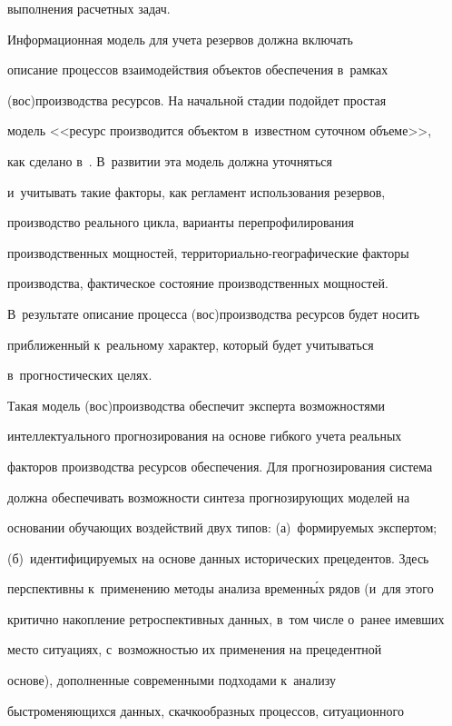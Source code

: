 выполнения расчетных задач.

     

     Информационная модель для учета резервов должна включать 

описание процессов взаимодействия объектов обеспечения в~рамках 

(вос)про\-из\-вод\-ст\-ва ресурсов. На начальной стадии подойдет простая 

модель <<ресурс производится объектом в~известном суточном объеме>>, 

как сделано в~\cite{15-zh}. В~развитии эта модель должна уточняться 

и~учитывать такие факторы, как регламент использования резервов, 

производство реального цикла, варианты перепрофилирования 

производственных мощностей, территориально-географические факторы 

производства, фактическое состояние производственных мощностей. 

В~результате описание процесса (вос)производства ресурсов будет носить 

приближенный к~реальному характер, который будет учитываться 

в~прогностических целях.

     

     Такая модель (вос)производства обеспечит эксперта возможностями 

интеллектуального прогнозирования на основе гибкого учета реальных 

факторов производства ресурсов обеспечения. Для прогнозирования система 

должна обеспечивать возможности синтеза прогнозирующих моделей на 

основании обучающих воздействий двух типов: (а)~формируемых экспертом; 

(б)~идентифицируемых на основе данных исторических прецедентов. Здесь 

перспективны к~применению методы анализа временн\'{ы}х рядов (и~для этого 

критично накопление ретроспективных данных, в~том числе о~ранее  имев\-ших 

место ситуациях, с~возможностью их применения на прецедентной 

основе), дополненные современными подходами к~анализу 

быстроменяющихся данных, скачкообразных процессов, ситуационного 

